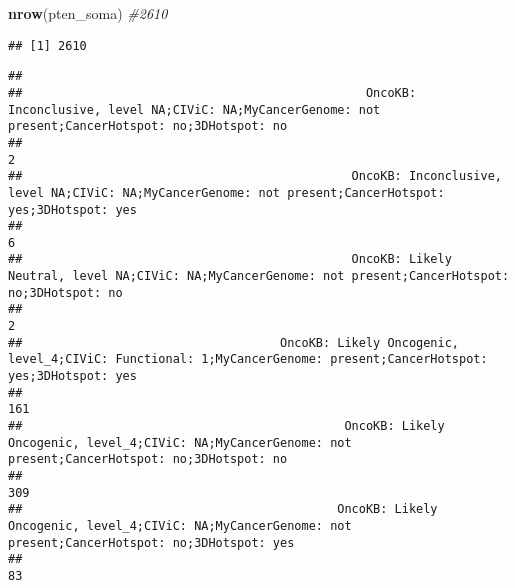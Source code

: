 \documentclass[
]{article}
\newenvironment{Shaded}{\begin{snugshade}}{\end{snugshade}}
\newcommand{\CommentTok}[1]{\textcolor[rgb]{0.56,0.35,0.01}{\textit{#1}}}
\newcommand{\FunctionTok}[1]{\textcolor[rgb]{0.13,0.29,0.53}{\textbf{#1}}}
\newcommand{\NormalTok}[1]{#1}
\newcommand{\SpecialCharTok}[1]{\textcolor[rgb]{0.81,0.36,0.00}{\textbf{#1}}}
\begin{document}
\begin{Shaded}
\begin{Highlighting}[]
\FunctionTok{nrow}\NormalTok{(pten\_soma) }\CommentTok{\#2610}
\end{Highlighting}
\end{Shaded}

\begin{verbatim}
## [1] 2610
\end{verbatim}

\begin{Shaded}
\end{Shaded}

\begin{verbatim}
## 
##                                                OncoKB: Inconclusive, level NA;CIViC: NA;MyCancerGenome: not present;CancerHotspot: no;3DHotspot: no 
##                                                                                                                                                   2 
##                                              OncoKB: Inconclusive, level NA;CIViC: NA;MyCancerGenome: not present;CancerHotspot: yes;3DHotspot: yes 
##                                                                                                                                                   6 
##                                              OncoKB: Likely Neutral, level NA;CIViC: NA;MyCancerGenome: not present;CancerHotspot: no;3DHotspot: no 
##                                                                                                                                                   2 
##                                    OncoKB: Likely Oncogenic, level_4;CIViC: Functional: 1;MyCancerGenome: present;CancerHotspot: yes;3DHotspot: yes 
##                                                                                                                                                 161 
##                                             OncoKB: Likely Oncogenic, level_4;CIViC: NA;MyCancerGenome: not present;CancerHotspot: no;3DHotspot: no 
##                                                                                                                                                 309 
##                                            OncoKB: Likely Oncogenic, level_4;CIViC: NA;MyCancerGenome: not present;CancerHotspot: no;3DHotspot: yes 
##                                                                                                                                                  83 

\end{verbatim}
\end{document}
